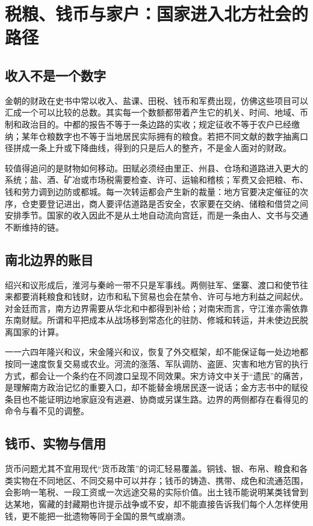\section{税粮、钱币与家户：国家进入北方社会的路径}

\subsection{收入不是一个数字}

金朝的财政在史书中常以收入、盐课、田税、钱币和军费出现，仿佛这些项目可以汇成一个可以比较的总数。其实每一个数额都带着产生它的机关、时间、地域、币制和政治目的。中都的报告不等于一条边路的实收；规定征收不等于农户已经缴纳；某年仓粮数字也不等于当地居民实际拥有的粮食。若把不同文献的数字抽离口径拼成一条上升或下降曲线，得到的只是后人的整齐，不是金人面对的财政。

较值得追问的是财物如何移动。田赋必须经由里正、州县、仓场和道路进入更大的系统；盐、酒、矿冶或市场税需要检查、许可、运输和稽核；军费又会把粮、布、钱和劳力调到边防或都城。每一次转运都会产生新的裁量：地方官要决定催征的次序，仓吏要登记进出，商人要评估道路是否安全，农家要在交纳、储粮和借贷之间安排季节。国家的收入因此不是从土地自动流向宫廷，而是一条由人、文书与交通不断维持的链。

\subsection{南北边界的账目}

绍兴和议形成后，淮河与秦岭一带不只是军事线。两侧驻军、堡寨、渡口和使节往来都要消耗粮食和钱财，边市和私下贸易也会在禁令、许可与地方利益之间起伏。对金廷而言，南方边界需要从华北和中都得到补给；对南宋而言，守江淮亦需依靠东南财赋。所谓和平把成本从战场移到常态化的驻防、修城和转运，并未使边民脱离国家的计算。

一一六四年隆兴和议，宋金隆兴和议，恢复了外交框架，却不能保证每一处边地都按同一速度恢复交易或农业。河流的涨落、军队调防、盗匪、灾害和地方官的执行方式，都会让一个条约在不同渡口呈现不同效果。宋方诗文中关于“遗民”的痛苦，是理解南方政治记忆的重要入口，却不能替金境居民逐一说话；金方志书中的赋役条目也不能证明边地家庭没有逃避、协商或另谋生路。边界的两侧都存在看得见的命令与看不见的调整。

\subsection{钱币、实物与信用}

货币问题尤其不宜用现代“货币政策”的词汇轻易覆盖。铜钱、银、布帛、粮食和各类实物在不同地区、不同交易中可以并存；钱币的铸造、携带、成色和流通范围，会影响一笔税、一段工资或一次远途交易的实际价值。出土钱币能说明某类钱曾到达某地，窖藏的封藏期也许提示战争或不安，却不能直接告诉我们每个人怎样使用钱，更不能把一批遗物等同于全国的景气或崩溃。


